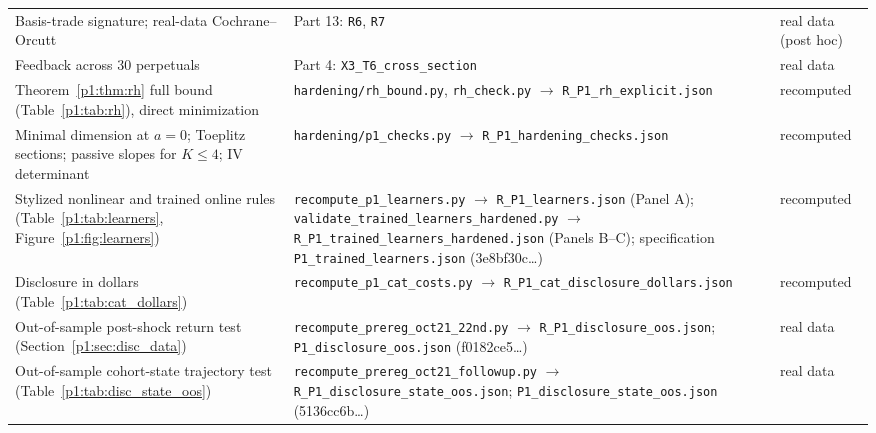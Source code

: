 \begin{longtable}{p{}p{}p{}}
Basis-trade signature; real-data Cochrane--Orcutt & Part 13: \texttt{R6}, \texttt{R7} & real data (post hoc)\\
Feedback across 30 perpetuals & Part 4: \texttt{X3\_T6\_cross\_section} & real data\\
Theorem~\ref{p1:thm:rh} full bound (Table~\ref{p1:tab:rh}), direct minimization & \texttt{hardening/rh\_bound.py}, \texttt{rh\_check.py} $\to$ \texttt{R\_P1\_rh\_explicit.json} & recomputed\\
Minimal dimension at $a=0$; Toeplitz sections; passive slopes for $K\le4$; IV determinant & \texttt{hardening/p1\_checks.py} $\to$ \texttt{R\_P1\_hardening\_checks.json} & recomputed\\
Stylized nonlinear and trained online rules (Table~\ref{p1:tab:learners}, Figure~\ref{p1:fig:learners}) & \texttt{recompute\_\allowbreak p1\_\allowbreak learners.py} $\to$ \texttt{R\_P1\_\allowbreak learners.json} (Panel A); \texttt{validate\_\allowbreak trained\_\allowbreak learners\_\allowbreak hardened.py} $\to$ \texttt{R\_P1\_\allowbreak trained\_\allowbreak learners\_\allowbreak hardened.json} (Panels B--C); specification \texttt{P1\_\allowbreak trained\_\allowbreak learners.json} (3e8bf30c\ldots) & recomputed\\
Disclosure in dollars (Table~\ref{p1:tab:cat_dollars}) & \texttt{recompute\_\allowbreak p1\_\allowbreak cat\_\allowbreak costs.py} $\to$ \texttt{R\_P1\_\allowbreak cat\_\allowbreak disclosure\_\allowbreak dollars.json} & recomputed\\
Out-of-sample post-shock return test (Section~\ref{p1:sec:disc_data}) & \texttt{recompute\_\allowbreak prereg\_\allowbreak oct21\_\allowbreak 22nd.py} $\to$ \texttt{R\_P1\_\allowbreak disclosure\_\allowbreak oos.json}; \texttt{P1\_\allowbreak disclosure\_\allowbreak oos.json} (f0182ce5\ldots) & real data\\
Out-of-sample cohort-state trajectory test (Table~\ref{p1:tab:disc_state_oos}) & \texttt{recompute\_\allowbreak prereg\_\allowbreak oct21\_\allowbreak followup.py} $\to$ \texttt{R\_P1\_\allowbreak disclosure\_\allowbreak state\_\allowbreak oos.json}; \texttt{P1\_\allowbreak disclosure\_\allowbreak state\_\allowbreak oos.json} (5136cc6b\ldots) & real data\\
\bottomrule
\end{longtable}



